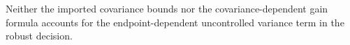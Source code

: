 Neither the imported covariance bounds nor the covariance-dependent gain formula accounts for the endpoint-dependent uncontrolled variance term in the robust decision.